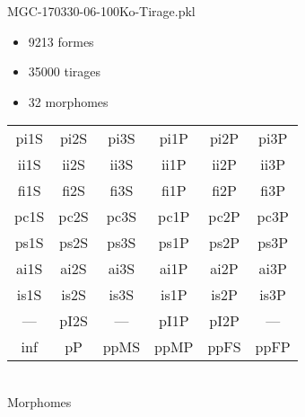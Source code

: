 MGC-170330-06-100Ko-Tirage.pkl
\begin{itemize}
\item 9213 formes
\item 35000 tirages
\item 32 morphomes
\end{itemize}
\begin{center}
\begin{tabular}{cccccc}
\hline
\cellcolor{white}pi1S & \cellcolor{orange}pi2S & \cellcolor{orange}pi3S & \cellcolor{white}pi1P & \cellcolor{white}pi2P & \cellcolor{white}pi3P\\
\cellcolor{brown}ii1S & \cellcolor{brown}ii2S & \cellcolor{brown}ii3S & \cellcolor{white}ii1P & \cellcolor{white}ii2P & \cellcolor{brown}ii3P\\
\cellcolor{yellow}fi1S & \cellcolor{lime}fi2S & \cellcolor{lime}fi3S & \cellcolor{green}fi1P & \cellcolor{white}fi2P & \cellcolor{green}fi3P\\
\cellcolor{yellow}pc1S & \cellcolor{yellow}pc2S & \cellcolor{yellow}pc3S & \cellcolor{white}pc1P & \cellcolor{white}pc2P & \cellcolor{yellow}pc3P\\
\cellcolor{teal}ps1S & \cellcolor{white}ps2S & \cellcolor{teal}ps3S & \cellcolor{white}ps1P & \cellcolor{white}ps2P & \cellcolor{teal}ps3P\\
\cellcolor{white}ai1S & \cellcolor{lightgray}ai2S & \cellcolor{lightgray}ai3S & \cellcolor{white}ai1P & \cellcolor{magenta}ai2P & \cellcolor{white}ai3P\\
\cellcolor{black}is1S & \cellcolor{white}is2S & \cellcolor{lightgray}is3S & \cellcolor{black}is1P & \cellcolor{black}is2P & \cellcolor{white}is3P\\
--- & \cellcolor{white}pI2S & --- & \cellcolor{white}pI1P & \cellcolor{white}pI2P & ---\\
\cellcolor{white}inf & \cellcolor{white}pP & \cellcolor{white}ppMS & \cellcolor{white}ppMP & \cellcolor{magenta}ppFS & \cellcolor{magenta}ppFP\\
\hline
\end{tabular}\\
Morphomes
\end{center}
\bigskip

